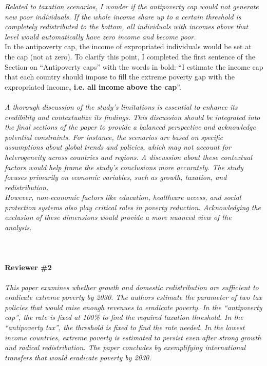 \documentclass[12pt,english]{article}
\begin{document}
\textit{Related to taxation scenarios, I wonder if the antipoverty cap would not generate new poor individuals. If the whole income share up to a certain threshold is completely redistributed to the bottom, all individuals with incomes above that level would automatically have zero income and become poor. }~\\

In the antipoverty cap, the income of expropriated individuals would be set at the cap (not at zero). To clarify this point, I completed the first sentence of the Section on ``Antipoverty caps'' with the words in bold: ``I estimate the income cap that each country should impose to fill the extreme poverty gap with the expropriated income\textbf{, i.e. all income above the cap}''.
~\\ ~\\

\textit{A thorough discussion of the study's limitations is essential to enhance its credibility and contextualize its findings. This discussion should be integrated into the final sections of the paper to provide a balanced perspective and acknowledge potential constraints. For instance, the scenarios are based on specific assumptions about global trends and policies, which may not account for heterogeneity across countries and regions. A discussion about these contextual factors would help frame the study's conclusions more accurately. The study focuses primarily on economic variables, such as growth, taxation, and redistribution. }~\\
\textit{However, non-economic factors like education, healthcare access, and social protection systems also play critical roles in poverty reduction. Acknowledging the exclusion of these dimensions would provide a more nuanced view of the analysis.}~\\

~\\ ~\\


\paragraph*{Reviewer \#2}

\textit{This paper examines whether growth and domestic redistribution are sufficient to eradicate extreme poverty by 2030. The authors estimate the parameter of two tax policies that would raise enough revenues to eradicate poverty. In the “antipoverty cap”, the rate is fixed at 100\% to find the required taxation threshold. In the “antipoverty tax”, the threshold is fixed to find the rate needed. In the lowest income countries, extreme poverty is estimated to persist even after strong growth and radical redistribution. The paper concludes by exemplifying international transfers that would eradicate poverty by 2030. }~\\
\end{document}
